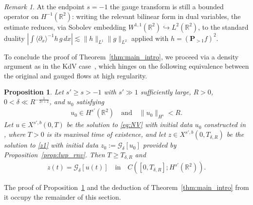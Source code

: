 \documentclass[a4paper,
11pt,  reqno]{amsart}
\newcommand{\jap}[1]{\langle #1 \rangle}
\newcommand{\5}{\textup{V}}
\newcommand{\FL}{\mathcal{F} L}
\newcommand{\les}{\lesssim}
\newcommand{\dl}{\delta}
\newcommand{\embeds}{\hookrightarrow}
\newcommand{\dx}{\partial_x}
\newtheorem{proposition}[theorem]{Proposition}
\theoremstyle{remark}
\newtheorem{remark}[theorem]{Remark}
\newcommand{\R}{\mathbb{R}}
\newcommand{\Gc}{\mathcal{G}}
\numberwithin{equation}{section}
\numberwithin{theorem}{section}
\begin{document}
\begin{remark}
At the endpoint $s=-1$ the gauge transform is still a bounded operator on $H^{-1}(\R^2)$: writing the relevant bilinear form in dual variables, the estimate reduces, via Sobolev embedding $W^{1,1}(\R^2)\embeds L^2(\R^2)$, to the standard duality $|\int \jap{\dx}^{-1} h\, g\,dx| \les \|h\|_{L^1}\|g\|_{L^2}$ applied with $h=(\mathbf{P}_{>1} f)^2$.
\end{remark}

To conclude the proof of Theorem~\ref{thm:main_intro}, we proceed via a density argument as in the KdV case~\cite{chcora}, which hinges on the following equivalence between the original and gauged flows at high regularity.

\begin{proposition}\label{PRO:equiv}
Let $s' \ge s > -1$ with $s'\gg1$ sufficiently large, $R>0$, $0<\dl \ll R^{-\frac{1}{2s+2}}$, and $u_0$ satisfying
\begin{align}\label{equiv-0}
u_0\in H^{s'}(\R^2) \quad \text{and} \quad \|u_0\|_{H^s}<R.
\end{align}
Let $u \in X^{s',b}(0,T)$ be the solution to \eqref{eq:NV} with initial data $u_0$ constructed in \cite{angelopolous, kazeykinamunoz1, kazeykinamunoz2}, where $T>0$ is its maximal time of existence, and let $z\in X^{s', b}(0,T_{\delta,R})$ be the solution to \eqref{z1} with initial data $z_0 := \Gc_\delta[u_0]$ provided by Proposition~\ref{prop:lwp_rnv}. Then $T \ge T_{\delta,R}$ and
\begin{align}\label{equiv-1}
z(t)=\Gc_\delta[u(t)] \quad \text{in} \quad C([0,T_{\delta,R}]; H^{s'}(\R^2)).
\end{align}
\end{proposition}

The proof of Proposition~\ref{PRO:equiv} and the deduction of Theorem~\ref{thm:main_intro} from it occupy the remainder of this section.

%
\end{document}
